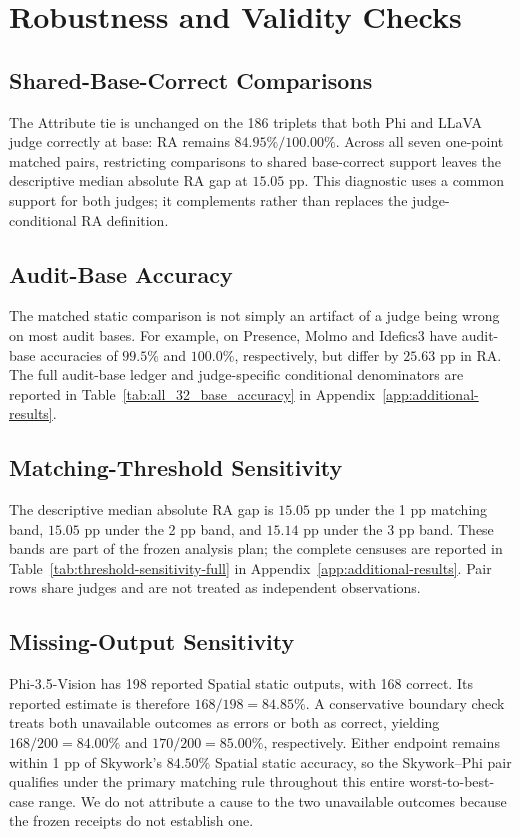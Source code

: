 \section{Robustness and Validity Checks}
\label{sec:robustness}

\subsection{Shared-Base-Correct Comparisons}

The Attribute tie is unchanged on the 186 triplets that both Phi and LLaVA
judge correctly at base: RA remains $84.95\%/100.00\%$. Across all seven
one-point matched pairs, restricting comparisons to shared base-correct support
leaves the descriptive median absolute RA gap at $15.05$ pp. This diagnostic
uses a common support for both judges; it complements rather than replaces the
judge-conditional RA definition.

\subsection{Audit-Base Accuracy}

The matched static comparison is not simply an artifact of a judge being wrong
on most audit bases. For example, on Presence, Molmo and Idefics3 have audit-base
accuracies of $99.5\%$ and $100.0\%$, respectively, but differ by $25.63$ pp in
RA. The full audit-base ledger and judge-specific conditional denominators are
reported in Table~\ref{tab:all_32_base_accuracy} in
Appendix~\ref{app:additional-results}.

\subsection{Matching-Threshold Sensitivity}

The descriptive median absolute RA gap is $15.05$ pp under the 1 pp matching
band, $15.05$ pp under the 2 pp band, and $15.14$ pp under the 3 pp band. These
bands are part of the frozen analysis plan; the complete censuses are reported
in Table~\ref{tab:threshold-sensitivity-full} in
Appendix~\ref{app:additional-results}. Pair rows share judges and
are not treated as independent observations.

\subsection{Missing-Output Sensitivity}

Phi-3.5-Vision has 198 reported Spatial static outputs, with 168 correct. Its
reported estimate is therefore $168/198=84.85\%$. A conservative boundary
check treats both unavailable outcomes as errors or both as correct, yielding
$168/200=84.00\%$ and $170/200=85.00\%$, respectively. Either endpoint remains
within 1 pp of Skywork's $84.50\%$ Spatial static accuracy, so the
Skywork--Phi pair qualifies under the primary matching rule throughout this
entire worst-to-best-case range. We do not attribute a cause to the two
unavailable outcomes because the frozen receipts do not establish one.

